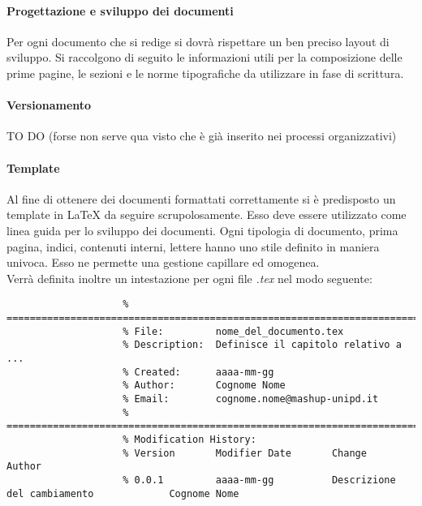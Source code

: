 			\paragraph{Progettazione e sviluppo dei documenti}
			Per ogni documento che si redige si dovrà rispettare un ben preciso layout di sviluppo. Si raccolgono di seguito le informazioni utili per la composizione delle prime pagine, le sezioni e le norme tipografiche da utilizzare in fase di scrittura.

			\paragraph{Versionamento} TO DO (forse non serve qua visto che è già inserito nei processi organizzativi)

			\paragraph{Template}
			Al fine di ottenere dei documenti formattati correttamente si è predisposto un template in \LaTeX{} da seguire scrupolosamente. Esso deve essere utilizzato come linea guida per lo sviluppo dei documenti. Ogni tipologia di documento, prima pagina, indici, contenuti interni, lettere hanno uno stile definito in maniera univoca. Esso ne permette una gestione capillare ed omogenea.\\
			Verrà definita inoltre un intestazione per ogni file \emph{.tex} nel modo seguente:
				\begin{verbatim}
					% ==================================================================================
					% File:			nome_del_documento.tex
					% Description:	Definisce il capitolo relativo a ...
					% Created:		aaaa-mm-gg
					% Author:		Cognome Nome
					% Email:		cognome.nome@mashup-unipd.it
					% ===================================================================================
					% Modification History:
					% Version		Modifier Date		Change									Author
					% 0.0.1 		aaaa-mm-gg 			Descrizione del cambiamento				Cognome Nome
					
				\end{verbatim}
			\noindent

